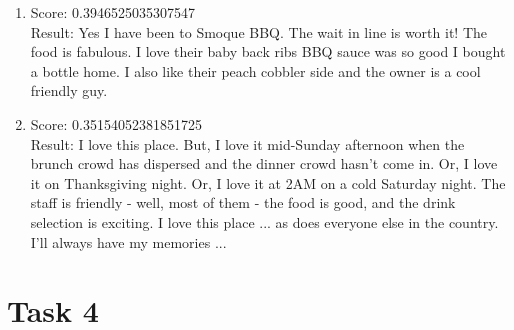 \documentclass[paper=a4, fontsize=11pt]{jhwhw} %
\begin{document}
\begin{itemize}
\begin{enumerate}
\item Score: 0.3946525035307547\\
Result: Yes I have been to Smoque BBQ. The wait in line is worth it! The food is fabulous. I love their baby back ribs BBQ sauce was so good I bought a bottle home. I also like their peach cobbler side and the owner is a cool friendly guy.
\item Score: 0.35154052381851725\\
Result: I love this place. But, I love it mid-Sunday afternoon when the brunch crowd has dispersed and the dinner crowd hasn't come in. Or, I love it on Thanksgiving night. Or, I love it at 2AM on a cold Saturday night. The staff is friendly - well, most of them - the food is good, and the drink selection is exciting. I love this place ... as does everyone else in the country. I'll always have my memories ...
\end{enumerate}
\end{itemize}
\section{Task 4}
\end{document}
